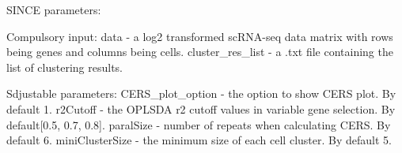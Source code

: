 \documentclass[11pt]{article}\usepackage[]{graphicx}\usepackage[]{color}
\begin{document}
SINCE parameters:

Compulsory input:
data - a log2 transformed scRNA-seq data matrix with rows being genes and columns being cells.
cluster\_res\_list - a .txt file containing the list of clustering results.

Sdjustable parameters:
CERS\_plot\_option - the option to show CERS plot. By default 1.
r2Cutoff - the OPLSDA r2 cutoff values in variable gene selection. By default[0.5, 0.7, 0.8].
paralSize - number of repeats when calculating CERS. By default 6.
miniClusterSize - the minimum size of each cell cluster. By default 5.

\end{document}

